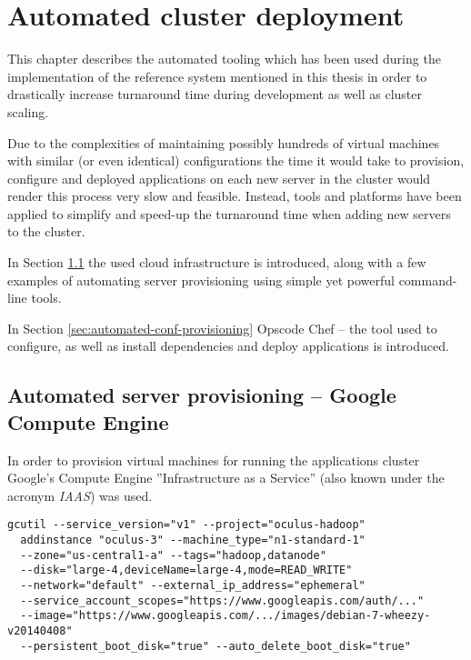 \chapter{Automated cluster deployment}
\label{app:chef}
This chapter describes the automated tooling which has been used during the implementation of the reference system mentioned in this thesis in order to drastically increase turnaround time during development as well as cluster scaling.

Due to the complexities of maintaining possibly hundreds of virtual machines with similar (or even identical) configurations the time it would take to provision, configure and deployed applications on each new server in the cluster would render this process very slow and feasible. Instead, tools and platforms have been applied to simplify and speed-up the turnaround time when adding new servers to the cluster. 

In Section \ref{sec:automated-server-provisioning} the used cloud infrastructure is introduced, along with a few examples of automating server provisioning using simple yet powerful command-line tools. 

In Section \ref{sec:automated-conf-provisioning} Opscode Chef -- the tool used to configure, as well as install dependencies and deploy applications is introduced.

\section{Automated server provisioning -- Google Compute Engine}
\label{sec:automated-server-provisioning}

In order to provision virtual machines for running the applications cluster Google's Compute Engine ''Infrastructure as a Service'' (also known under the acronym \textit{IAAS}) was used. 


\begin{lstlisting}[caption={Creating new instance on GCE}, label={lst:new-gce-instance-bash}]
gcutil --service_version="v1" --project="oculus-hadoop" 
  addinstance "oculus-3" --machine_type="n1-standard-1" 
  --zone="us-central1-a" --tags="hadoop,datanode"
  --disk="large-4,deviceName=large-4,mode=READ_WRITE"
  --network="default" --external_ip_address="ephemeral" 
  --service_account_scopes="https://www.googleapis.com/auth/..." 
  --image="https://www.googleapis.com/.../images/debian-7-wheezy-v20140408" 
  --persistent_boot_disk="true" --auto_delete_boot_disk="true"
\end{lstlisting}



